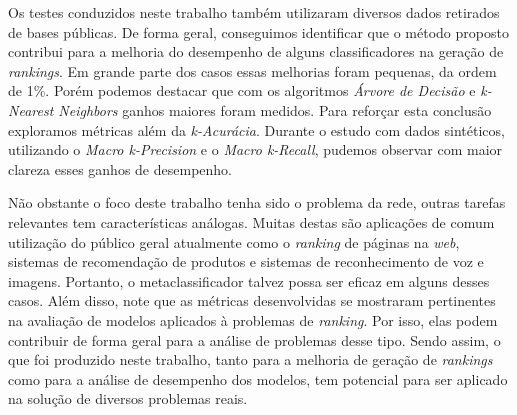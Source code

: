 Os testes conduzidos neste trabalho também utilizaram diversos dados retirados de bases públicas.
De forma geral, conseguimos identificar que o método proposto contribui para a melhoria do desempenho de alguns classificadores na geração de \textit{rankings}.
Em grande parte dos casos essas melhorias foram pequenas, da ordem de 1\%.
Porém podemos destacar que com os algoritmos \textit{Árvore de Decisão} e \textit{k-Nearest Neighbors} ganhos maiores foram medidos.
Para reforçar esta conclusão exploramos métricas além da \textit{k-Acurácia}.
Durante o estudo com dados sintéticos, utilizando o \textit{Macro k-Precision} e o \textit{Macro k-Recall}, pudemos observar com maior clareza esses ganhos de desempenho.

Não obstante o foco deste trabalho tenha sido o problema da rede, outras tarefas relevantes tem características análogas.
Muitas destas são aplicações de comum utilização do público geral atualmente como o \textit{ranking} de páginas na \textit{web}, sistemas de recomendação de produtos e sistemas de reconhecimento de voz e imagens.
Portanto, o metaclassificador talvez possa ser eficaz em alguns desses casos.
Além disso, note que as métricas desenvolvidas se mostraram pertinentes na avaliação de modelos aplicados à problemas de \textit{ranking}.
Por isso, elas podem contribuir de forma geral para a análise de problemas desse tipo.
Sendo assim, o que foi produzido neste trabalho, tanto para a melhoria de geração de \textit{rankings} como para a análise de desempenho dos modelos, tem potencial para ser aplicado na solução de diversos problemas reais.

